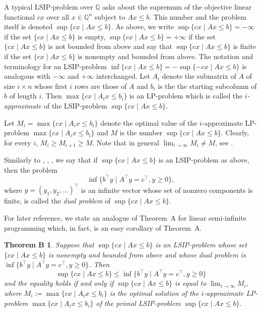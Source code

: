 \documentclass[10pt, reqno]{amsart}
\numberwithin{equation}{section}
\newtheorem*{TB}{Theorem B}
\begin{document}
A typical LSIP-problem over $\mathbb Q$ asks about the supremum  of the objective linear functional $cx$  over all $x \in \mathbb Q^{n}$ subject to $Ax \le b$.  This number  and the problem itself is denoted $\sup \{ cx \mid Ax \le b \}$. As above, we write $\sup \{ cx \mid Ax \le b \} = -\infty$ if the set $\{ cx \mid Ax \le b    \}$ is empty,  $\sup \{ cx \mid Ax \le b    \} = +\infty$ if the set $\{ cx \mid Ax \le b    \}$ is not bounded from above and say that
 $\sup \{ cx \mid Ax \le b    \} $ is finite if the set $\{ cx \mid Ax \le b    \}$ is nonempty and bounded from above.  The notation and terminology for an LSIP-problem
 $\inf \{ cx \mid Ax \le b \} = -  \sup \{ -cx \mid Ax \le b    \} $ is analogous with $-\infty$ and $+\infty$ interchanged.  Let $A_i$ denote the submatrix of $A$ of size $i \times n$ whose first $i$ rows are those of $A$ and $b_i$ is the the starting subcolumn of $b$ of  length $i$. Then
 $\max\{ cx \mid A_i x \le b_i \} $ is an LP-problem which is called the  {\em $i$-approximate} of the LSIP-problem  $\sup \{ cx \mid Ax \le b  \}$.

 Let  $M_i = \max\{ cx \mid A_i x \le b_i \}$ denote the optimal value of the $i$-approximate LP-problem  $\max\{ cx \mid A_i x \le b_i \}$ and $M$ is the number $\sup \{ cx \mid Ax \le b    \}$. Clearly, for every $i$, $M_i \ge M_{i+1}  \ge M$.    Note that in general  $\lim_{i \to \infty} M_i \ne M$, see  \cite{LSIP1, LSIP2}.

Similarly  to  \cite{LSIP1}, \cite{LSIP2},  \cite{LSIP3},  we say that
if $\sup \{ cx \mid Ax \le b   \} $ is an LSIP-problem as above, then the problem
$$
\inf \{ b^{\top}y \mid A^{\top}y = c^{\top}, y\ge 0  \} ,
$$
where  $y = (y_1, y_2, \dots )^{\top}$ is an infinite vector whose set of nonzero components is finite, is called the {\em dual problem} of  $\sup \{ cx \mid Ax \le b  \}$.

For later reference, we state an analogue of Theorem~A for linear semi-infinite programming which, in fact, is an easy corollary of Theorem~A.

\begin{TB}  Suppose that $\sup \{ cx \mid Ax \le b    \}$ is an LSIP-problem
whose set $\{ cx \mid Ax \le b    \}$ is nonempty and bounded from above and whose dual problem is  $\inf \{ b^{\top}y \mid A^{\top}y = c^{\top}, y\ge 0  \} $.  Then
 \begin{equation}\label{dtt}
\sup \{ cx \mid Ax \le b    \}  \le   \inf \{ b^{\top}y \mid A^{\top}y = c^{\top}, y\ge 0  \}
\end{equation}
and the equality holds  if and only if
$\sup \{ cx \mid Ax \le b    \}$ is equal to  $\lim_{i \to \infty} M_i$,
where $M_i := \max\{ cx \mid A_i x \le b_i \}$ is the optimal solution of  the
$i$-approximate LP-problem $\max\{ cx \mid A_i x \le b_i \}$
of the primal LSIP-problem  $\sup \{ cx \mid Ax \le b  \}$.
\end{TB}
\end{document}
